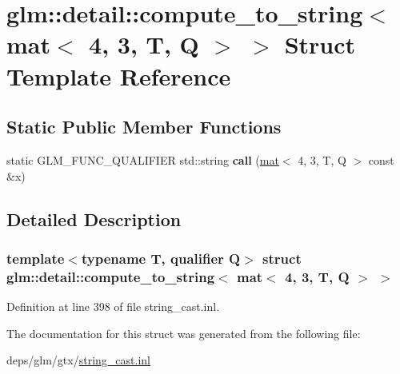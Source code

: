 \hypertarget{structglm_1_1detail_1_1compute__to__string_3_01mat_3_014_00_013_00_01T_00_01Q_01_4_01_4}{}\section{glm\+:\+:detail\+:\+:compute\+\_\+to\+\_\+string$<$ mat$<$ 4, 3, T, Q $>$ $>$ Struct Template Reference}
\label{structglm_1_1detail_1_1compute__to__string_3_01mat_3_014_00_013_00_01T_00_01Q_01_4_01_4}
\subsection*{Static Public Member Functions}
\begin{DoxyCompactItemize}
\item 
\mbox{\label{structglm_1_1detail_1_1compute__to__string_3_01mat_3_014_00_013_00_01T_00_01Q_01_4_01_4_a25c5199fbde991582ba0afe092c4ec17}} 
static G\+L\+M\+\_\+\+F\+U\+N\+C\+\_\+\+Q\+U\+A\+L\+I\+F\+I\+ER std\+::string {\bfseries call} (\hyperlink{structglm_1_1mat}{mat}$<$ 4, 3, T, Q $>$ const \&x)
\end{DoxyCompactItemize}


\subsection{Detailed Description}
\subsubsection*{template$<$typename T, qualifier Q$>$\newline
struct glm\+::detail\+::compute\+\_\+to\+\_\+string$<$ mat$<$ 4, 3, T, Q $>$ $>$}



Definition at line 398 of file string\+\_\+cast.\+inl.



The documentation for this struct was generated from the following file\+:\begin{DoxyCompactItemize}
\item 
deps/glm/gtx/\hyperlink{string__cast_8inl}{string\+\_\+cast.\+inl}\end{DoxyCompactItemize}
